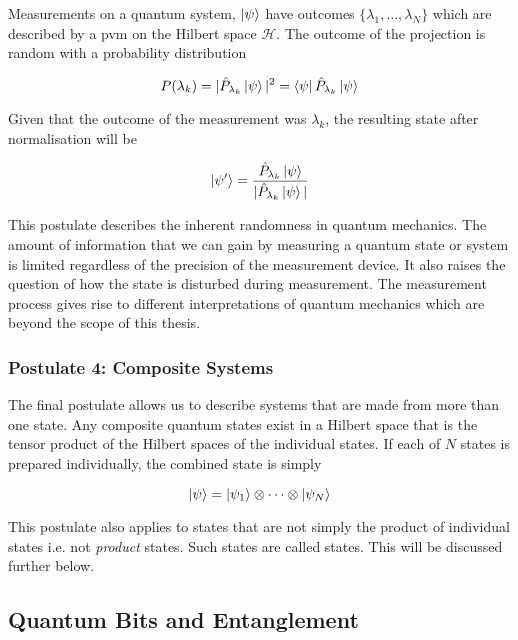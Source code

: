Measurements on a quantum system, $\ket{\psi}$ have outcomes $\{\lambda_1, \ldots, \lambda_N\}$ which are described by a \ac{pvm} on the Hilbert space $\mathcal{H}$. The outcome of the projection is random with a probability distribution

\begin{equation}
	P(\lambda_k) = |\hat{P}_{\lambda_k}\ket{\psi}|^2 = \bra{\psi}\hat{P}_{\lambda_k}\ket{\psi}
\end{equation}

Given that the outcome of the measurement was $\lambda_k$, the resulting state after normalisation will be

\begin{equation}
	\ket{\psi'} = \frac{\hat{P}_{\lambda_k}\ket{\psi}}{|\hat{P}_{\lambda_k}\ket{\psi}|}
\end{equation}

This postulate describes the inherent randomness in quantum mechanics. The amount of information that we can gain by measuring a quantum state or system is limited regardless of the precision of the measurement device. It also raises the question of how the state is disturbed during measurement. The measurement process gives rise to different interpretations of quantum mechanics which are beyond the scope of this thesis.


\subsubsection*{Postulate 4: Composite Systems}

The final postulate allows us to describe systems that are made from more than one state. Any composite quantum states exist in a Hilbert space that is the tensor product of the Hilbert spaces of the individual states. If each of $N$ states is prepared individually, the combined state is simply

\begin{equation}
	\ket{\psi} = \ket{\psi_1}\otimes\cdots\otimes\ket{\psi_N}
\end{equation}

This postulate also applies to states that are not simply the product of individual states i.e. not \emph{product} states. Such states are called  states. This will be discussed further below.

\subsection{Quantum Bits and Entanglement}

